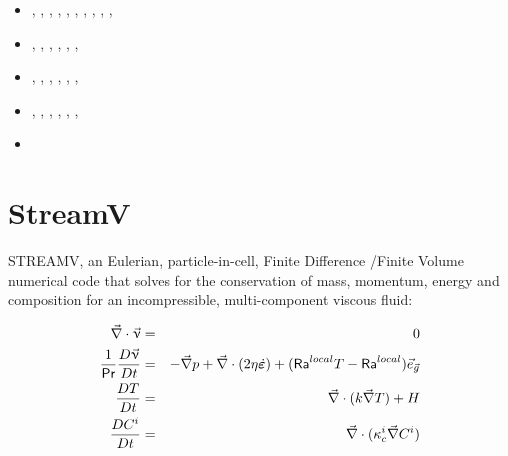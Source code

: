 \begin{small}
\begin{itemize}
                               \textcite{cohf19},  \textcite{crcm19},
                               \textcite{ulcw19},  \textcite{gicw19},
                               \textcite{jart19},  \textcite{jart19b}
\item[\twothousandtwenty]      \textcite{lalt20},  \textcite{gugb20},
                               \textcite{yabt20},  \textcite{arcf20}, 
                               \textcite{rits20},  \textcite{grlc20}, 
                               \textcite{scrt20},  \textcite{lorb20},
                               \textcite{bobm20},  \textcite{kacc20},
                               \textcite{uprc20}
\item[\twothousandtwentyone]   \textcite{roac21},  \textcite{lalt21}, \textcite{mebl21},
                               \textcite{gult21},  \textcite{gubt21}, \textcite{naka21},
                               \textcite{naka21}
\item[\twothousandtwentytwo]   \textcite{lids22},  \textcite{hulz22}, \textcite{adss22},
                               \textcite{bamo22},  \textcite{lalt22}, \textcite{gugt22},
                               \textcite{bota22}
\item[\twothousandtwentythree] \textcite{quzj23},  \textcite{titl23}, \textcite{lizl23},
                               \textcite{adsm23},  \textcite{gudl23}, \textcite{lelm23},
                               \textcite{naka23}
\item[\twothousandtwentyfour]  \textcite{jalt24}
\end{itemize}
\end{small}

\section{StreamV} 

STREAMV, an Eulerian, particle-in-cell, Finite Difference /Finite
Volume numerical code that solves for the conservation of mass, momentum, energy and
composition for an incompressible, multi-component viscous fluid:

\begin{eqnarray}
\vec\nabla \cdot \vec\upnu &=& 0 \\
\frac{1}{{\mathsf{Pr}}} \frac{D \vec\upnu}{Dt} 
&=& -\vec\nabla p +\vec\nabla \cdot (2\eta\dot{\bm \varepsilon} )
+ ({\mathsf{Ra}}^{local} T - {\mathsf{Ra}}^{local} )\vec{e}_{\vec g}   \\
\frac{DT}{Dt} &=& \vec\nabla \cdot (k \vec\nabla T) + H \\
\frac{DC^i}{Dt} &=& \vec\nabla \cdot (\kappa_c^i \vec\nabla C^i )  
\end{eqnarray}

